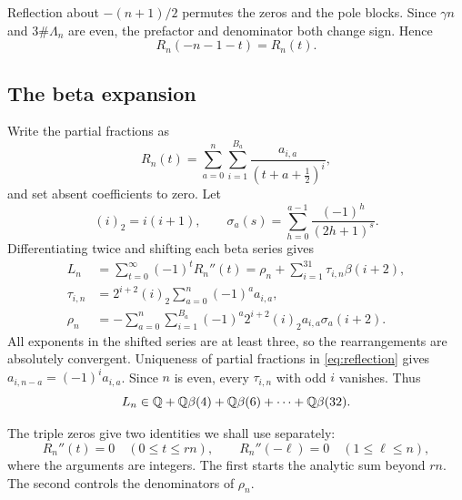 Reflection about $-(n+1)/2$ permutes the zeros and the pole blocks.
Since $\gamma n$ and $3\#\Lambda_n$ are even, the prefactor and
denominator both change sign. Hence
\begin{equation}\label{eq:reflection}
 R_n(-n-1-t)=R_n(t).
\end{equation}

\subsection{The beta expansion}
Write the partial fractions as
\[
 R_n(t)=\sum_{a=0}^{n}\sum_{i=1}^{B_a}
                   \frac{a_{i,a}}{(t+a+\tfrac12)^i},
\]
and set absent coefficients to zero. Let
\[
 (i)_2=i(i+1),\qquad
 \sigma_a(s)=\sum_{h=0}^{a-1}\frac{(-1)^h}{(2h+1)^s}.
\]
Differentiating twice and shifting each beta series gives
\begin{align}
 L_n&=\sum_{t=0}^{\infty}(-1)^tR_n''(t)
       =\rho_n+\sum_{i=1}^{31}\tau_{i,n}\beta(i+2),
                                                \label{eq:forms}\\
 \tau_{i,n}&=2^{i+2}(i)_2\sum_{a=0}^{n}(-1)^a a_{i,a},
                                                \label{eq:beta-coeff}\\
 \rho_n&=-\sum_{a=0}^{n}\sum_{i=1}^{B_a}
              (-1)^a2^{i+2}(i)_2a_{i,a}\sigma_a(i+2).
                                                \label{eq:constant}
\end{align}
All exponents in the shifted series are at least three, so the
rearrangements are absolutely convergent. Uniqueness of partial
fractions in \eqref{eq:reflection} gives
$a_{i,n-a}=(-1)^ia_{i,a}$. Since $n$ is even, every $\tau_{i,n}$
with odd $i$ vanishes. Thus
\begin{equation}\label{eq:target-span}
 L_n\in\mathbb Q+\mathbb Q\beta(4)+\mathbb Q\beta(6)+\cdots+\mathbb Q\beta(32).
\end{equation}

The triple zeros give two identities we shall use separately:
\begin{equation}\label{eq:zeros}
 R_n''(t)=0\quad(0\le t\le rn),\qquad
 R_n''(-\ell)=0\quad(1\le\ell\le n),
\end{equation}
where the arguments are integers. The first starts the analytic sum
beyond $rn$. The second controls the denominators of $\rho_n$.

